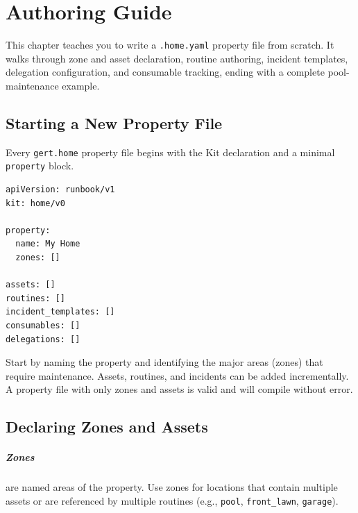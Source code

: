 \chapter{Authoring Guide}
\label{ch:authoring-guide}

This chapter teaches you to write a \texttt{.home.yaml} property file from scratch. It walks
through zone and asset declaration, routine authoring, incident templates, delegation
configuration, and consumable tracking, ending with a complete pool-maintenance example.

\section{Starting a New Property File}
\label{sec:authoring-start}

Every \texttt{gert.home} property file begins with the Kit declaration and a minimal
\texttt{property} block.

\begin{verbatim}
apiVersion: runbook/v1
kit: home/v0

property:
  name: My Home
  zones: []

assets: []
routines: []
incident_templates: []
consumables: []
delegations: []
\end{verbatim}

Start by naming the property and identifying the major areas (zones) that require maintenance.
Assets, routines, and incidents can be added incrementally. A property file with only zones
and assets is valid and will compile without error.

\section{Declaring Zones and Assets}
\label{sec:authoring-zones-assets}

\paragraph{Zones} are named areas of the property. Use zones for locations that contain
multiple assets or are referenced by multiple routines (e.g., \texttt{pool},
\texttt{front\_lawn}, \texttt{garage}).

